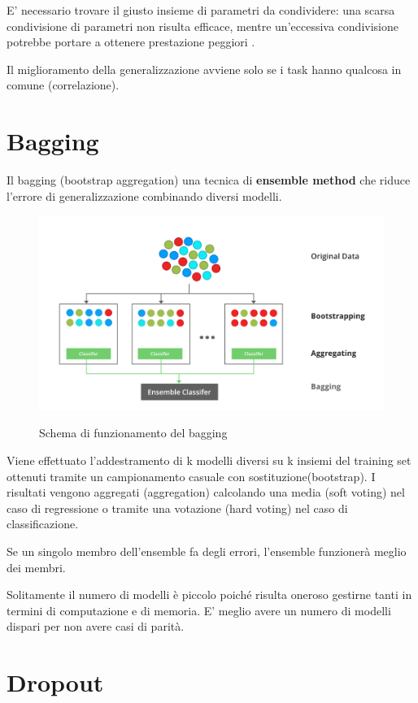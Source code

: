 E' necessario trovare il giusto insieme di parametri da condividere: una scarsa condivisione di parametri non risulta efficace, mentre un'eccessiva condivisione potrebbe portare a ottenere 
prestazione peggiori \cite{crawshaw2020multi}. 

Il miglioramento della generalizzazione avviene solo se i task hanno qualcosa in comune (correlazione).


\section{Bagging}
Il bagging (bootstrap aggregation) una tecnica di \textbf{ensemble method} che riduce 
l'errore di generalizzazione combinando diversi modelli.

\begin{figure}[h]
  \centering
  \includegraphics[width=0.9\linewidth]{images/bagging.png}
  \label{img:bagging}
  \caption{Schema di funzionamento del bagging \cite{img:bagging}}
\end{figure}

Viene effettuato l'addestramento di k modelli diversi su k insiemi del training set ottenuti tramite un campionamento casuale con sostituzione\footnotemark (bootstrap).
I risultati vengono aggregati (aggregation) calcolando una media (soft voting) nel caso di regressione o tramite una votazione (hard voting) nel caso di classificazione.

Se un singolo membro dell'ensemble fa degli errori, l'ensemble funzionerà meglio dei membri.

Solitamente il numero di modelli è piccolo poiché risulta oneroso gestirne tanti in termini di computazione e di memoria. 
E' meglio avere un numero di modelli dispari per non avere casi di parità.


\section{Dropout}
